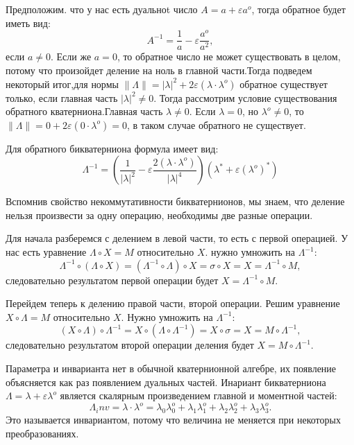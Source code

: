 Предположим. что у нас есть дуальноt число $A = a + \varepsilon a^o$, тогда обратное будет иметь вид:
\begin{equation*}
    A^{-1} = \frac{1}{a} - \varepsilon \frac{a^o}{a^2}, 
\end{equation*}
если $a \neq 0$. Если же $a = 0$, то обратное число не может существовать в целом, потому что произойдет деление на ноль в главной части.Тогда подведем некоторый итог,для нормы $\|\Lambda\| = |\lambda|^2 + 2\varepsilon (\lambda \cdot \lambda^o)$ обратное существует только, если главная часть $|\lambda|^2 \neq 0$.
Тогда рассмотрим условие существования обратного кватерниона.Главная часть $\lambda \neq 0$. Если $\lambda = 0$, но $\lambda^o \neq 0$, то $\|\Lambda\| = 0 + 2\varepsilon(0 \cdot \lambda^o) = 0$, в таком случае обратного не существует.

Для обратного бикватерниона формула имеет вид:
\begin{equation*}
    \Lambda^{-1} = \left( \frac{1}{|\lambda|^2} - \varepsilon \frac{2(\lambda \cdot \lambda^o)}{|\lambda|^4} \right) (\lambda^* + \varepsilon (\lambda^o)^*)
\end{equation*}

Вспомнив свойство некоммутативности бикватернионов, мы знаем, что деление нельзя произвести за одну операцию, необходимы две разные операции.

Для начала разберемся с делением в левой части, то есть с первой операцией. У нас есть уравнение $\Lambda \circ X = M$ относительно $X$. нужно умножить на $\Lambda^{-1}$:
\begin{equation*}
    \Lambda^{-1} \circ (\Lambda \circ X) = (\Lambda^{-1} \circ \Lambda) \circ X = \sigma \circ X = X = \Lambda^{-1} \circ M,
\end{equation*}
следовательно результатом первой операции будет $X = \Lambda^{-1} \circ M$.

Перейдем теперь к делению правой части, второй операции. Решим уравнение $X \circ \Lambda = M$ относительно $X$. Нужно умножить на $\Lambda^{-1}$:
\begin{equation*}
    (X \circ \Lambda) \circ \Lambda^{-1} = X \circ (\Lambda \circ \Lambda^{-1}) = X \circ \sigma = X = M \circ \Lambda^{-1},
\end{equation*}
следовательно результатом второй операции деления будет $X = M \circ \Lambda^{-1}$. 

Параметра и инварианта нет в обычной кватернионной алгебре, их появление объясняется как раз появлением дуальных частей. Инариант бикватерниона $\Lambda = \lambda + \varepsilon \lambda^o$ является скалярным произведением главной и моментной частей:
\begin{equation*}
    \Lambda_inv = \lambda \cdot \lambda^o = \lambda_0 \lambda_0^o + \lambda_1 \lambda_1^o + \lambda_2 \lambda_2^o + \lambda_3 \lambda_3^o.
\end{equation*}
Это называется инвариантом, потому что величина не меняется при некоторых преобразованиях.

